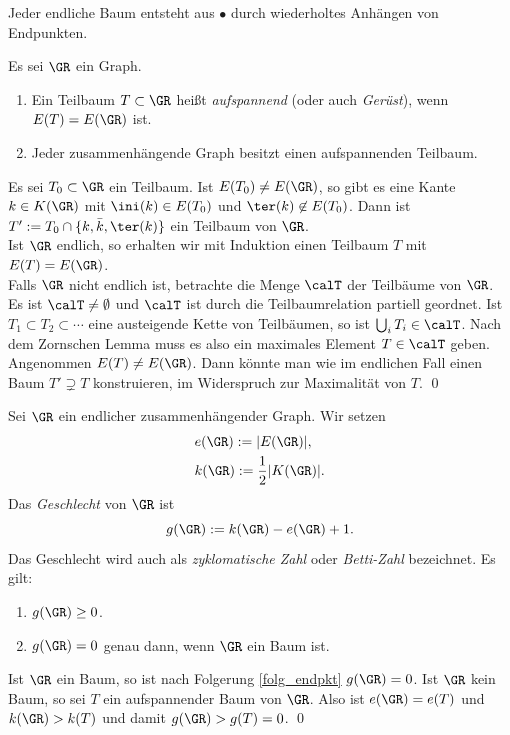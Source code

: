 \FOLG \label{folg_endpkt}
Jeder endliche Baum entsteht aus $\bullet$ durch wiederholtes
Anhängen von Endpunkten.

\DB Es sei $\GR$ ein Graph.
\begin{enumerate}
\item Ein Teilbaum $T\subset \GR$ heißt \emph{aufspannend}
(oder auch \emph{Gerüst}), wenn $E(T)=E(\GR)$ ist.
\item Jeder zusammenhängende Graph besitzt einen aufspannenden
Teilbaum.
\end{enumerate}
\bew
Es sei $T_0\subset \GR$ ein Teilbaum. Ist $E(T_0)\neq E(\GR)$,
so gibt es eine Kante $k\in K(\GR)$ mit
$\ini(k)\in E(T_0)$ und $\ter(k)\not\in E(T_0)$.
Dann ist $T' := T_0\cap\{k,\bar{k},\ter(k)\}$ ein Teilbaum von
$\GR$.\\
Ist $\GR$ endlich, so erhalten wir mit Induktion einen
Teilbaum $T$ mit $E(T)=E(\GR)$.\\
Falls $\GR$ nicht endlich ist, betrachte die Menge $\calT$ der
Teilbäume von $\GR$. Es ist $\calT\neq\emptyset$ und $\calT$
ist durch die Teilbaumrelation partiell geordnet.
Ist $T_1\subset T_2\subset \cdots$ eine austeigende Kette von
Teilbäumen, so ist $\bigcup_i T_i \in \calT$.
Nach dem Zornschen Lemma muss es also ein maximales Element
$T\in \calT$ geben.
Angenommen $E(T)\neq E(\GR)$. Dann könnte man wie im endlichen Fall
einen Baum $T'\supsetneq T$ konstruieren, im Widerspruch zur
Maximalität von $T$.
\qed

\DB \label{bem_geschlecht}
Sei $\GR$ ein endlicher zusammenhängender Graph.
Wir setzen
\begin{align*}
&e(\GR) := |E(\GR)|,\\
&k(\GR) := \frac{1}{2}|K(\GR)|.
\end{align*}
Das \emph{Geschlecht}
von $\GR$ ist
\[
g(\GR) := k(\GR) - e(\GR) + 1.
\]
Das Geschlecht wird auch als \emph{zyklomatische Zahl}
oder \emph{Betti-Zahl}
bezeichnet.
Es gilt:
\begin{enumerate}
\item $g(\GR) \geq 0$.
\item $g(\GR) = 0$ genau dann, wenn $\GR$ ein Baum ist.
\end{enumerate}
\bew Ist $\GR$ ein Baum, so ist nach Folgerung \ref{folg_endpkt}
$g(\GR)=0$. Ist $\GR$ kein Baum, so sei $T$ ein aufspannender Baum
von $\GR$. Also ist $e(\GR)=e(T)$ und $k(\GR)>k(T)$ und damit
$g(\GR)>g(T)=0$.
\qed

